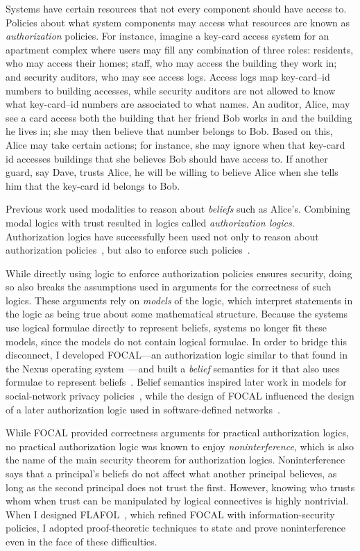 \documentclass{article}
\theoremstyle{definition}
\begin{document}
Systems have certain resources that not every component should have access to.
Policies about what system components may access what resources are known as \emph{authorization} policies.
For instance, imagine a key-card access system for an apartment complex where users may fill any combination of three roles: residents, who may access their homes; staff, who may access the building they work in; and security auditors, who may see access logs.
Access logs map key-card--id numbers to building accesses, while security auditors are not allowed to know what key-card--id numbers are associated to what names.
An auditor, Alice, may see a card access both the building that her friend Bob works in and the building he lives in; she may then believe that number belongs to Bob.
Based on this, Alice may take certain actions; for instance, she may ignore when that key-card id accesses buildings that she believes Bob should have access to.
If another guard, say Dave, trusts Alice, he will be willing to believe Alice when she tells him that the key-card id belongs to Bob.

Previous work used modalities to reason about \emph{beliefs} such as Alice's.
Combining modal logics with trust resulted in logics called \emph{authorization logics}.
Authorization logics have successfully been used not only to reason about authorization policies~\citep{Abadi06}, but also to enforce such policies~\cite{SchneiderWS11,SirerDBRSWWS11}.

While directly using logic to enforce authorization policies ensures security, doing so also breaks the assumptions used in arguments for the correctness of such logics.
These arguments rely on \emph{models} of the logic, which interpret statements in the logic as being true about some mathematical structure.
Because the systems use logical formulae directly to represent beliefs, systems no longer fit these models, since the models do not contain logical formulae.
In order to bridge this disconnect, I developed FOCAL---an authorization logic similar to that found in the Nexus operating system~\citep{SchneiderWS11,SirerDBRSWWS11}---and built a \emph{belief} semantics for it that also uses formulae to represent beliefs~\citep{HirschC13}.
Belief semantics inspired later work in models for social-network privacy policies~\cite{PardoS17}, while the design of FOCAL influenced the design of a later authorization logic used in software-defined networks~\citep{SkalkaRDKGDSF19}.

While FOCAL provided correctness arguments for practical authorization logics, no practical authorization logic was known to enjoy \emph{noninterference}, which is also the name of the main security theorem for authorization logics.
Noninterference says that a principal's beliefs do not affect what another principal believes, as long as the second principal does not trust the first.
However, knowing who trusts whom when trust can be manipulated by logical connectives is highly nontrivial.
When I designed FLAFOL~\citep{HirschACAT20}, which refined FOCAL with information-security policies, I adopted proof-theoretic techniques to state and prove noninterference even in the face of these difficulties.
\end{document}
